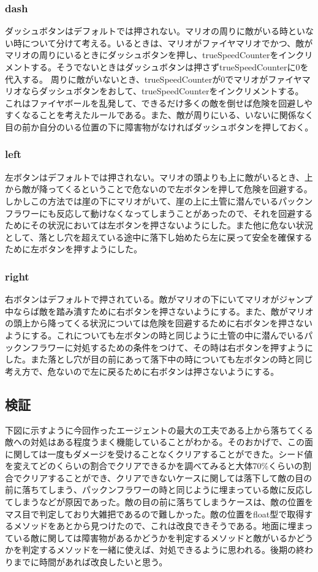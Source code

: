 \documentclass{jsarticle}
\begin{document}
\subsubsection{dash}
ダッシュボタンはデフォルトでは押されない。マリオの周りに敵がいる時といない時について分けて考える。いるときは、マリオがファイヤマリオでかつ、敵がマリオの周りにいるときにダッシュボタンを押し、trueSpeedCounterをインクリメントする。そうでないときはダッシュボタンは押さずtrueSpeedCounterに0を代入する。
周りに敵がいないとき、trueSpeedCounterが0でマリオがファイヤマリオならダッシュボタンをおして、trueSpeedCounterをインクリメントする。
これはファイヤボールを乱発して、できるだけ多くの敵を倒せば危険を回避しやすくなることを考えたルールである。また、敵が周りにいる、いないに関係なく目の前か自分のいる位置の下に障害物がなければダッシュボタンを押しておく。
\subsubsection{left}
左ボタンはデフォルトでは押されない。マリオの頭よりも上に敵がいるとき、上から敵が降ってくるということで危ないので左ボタンを押して危険を回避する。しかしこの方法では崖の下にマリオがいて、崖の上に土管に潜んでいるパックンフラワーにも反応して動けなくなってしまうことがあったので、それを回避するためにその状況においては左ボタンを押さないようにした。また他に危ない状況として、落とし穴を超えている途中に落下し始めたら左に戻って安全を確保するために左ボタンを押すようにした。
\subsubsection{right}
右ボタンはデフォルトで押されている。敵がマリオの下にいてマリオがジャンプ中ならば敵を踏み潰すために右ボタンを押さないようにする。また、敵がマリオの頭上から降ってくる状況については危険を回避するために右ボタンを押さないようにする。これについても左ボタンの時と同じように土管の中に潜んでいるパックンフラワーに対処するための条件をつけて、その時は右ボタンを押すようにした。また落とし穴が目の前にあって落下中の時についても左ボタンの時と同じ考え方で、危ないので左に戻るために右ボタンは押さないようにする。
\subsection{検証}
下図に示すように今回作ったエージェントの最大の工夫である上から落ちてくる敵への対処はある程度うまく機能していることがわかる。そのおかげで、この面に関しては一度もダメージを受けることなくクリアすることができた。シード値を変えてどのくらいの割合でクリアできるかを調べてみると大体70\%くらいの割合でクリアすることができ、クリアできないケースに関しては落下して敵の目の前に落ちてしまう、パックンフラワーの時と同じように埋まっている敵に反応してしまうなどが原因であった。敵の目の前に落ちてしまうケースは、敵の位置をマス目で判定しており大雑把であるので難しかった。敵の位置をfloat型で取得するメソッドをあとから見つけたので、これは改良できそうである。地面に埋まっている敵に関しては障害物があるかどうかを判定するメソッドと敵がいるかどうかを判定するメソッドを一緒に使えば、対処できるように思われる。後期の終わりまでに時間があれば改良したいと思う。
\end{document}

